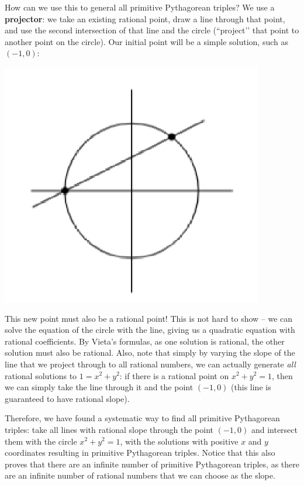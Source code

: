 \documentclass{article}
\begin{document}
How can we use this to general all primitive Pythagorean triples? We use a \textbf{projector}: we take an existing rational point, draw a line through that point, and use the second intersection of that line and the circle (``project’’ that point to another point on the circle). Our initial point will be a simple solution, such as $(-1, 0)$:

\begin{center}
\includegraphics[scale=1]{images/curve1.png}
\end{center}

This new point must also be a rational point! This is not hard to show – we can solve the equation of the circle with the line, giving us a quadratic equation with rational coefficients. By Vieta’s formulas, as one solution is rational, the other solution must also be rational. Also, note that simply by varying the slope of the line that we project through to all rational numbers, we can actually generate \textit{all} rational solutions to $1=x^2+y^2$: if there is a rational point on $x^2+y^2=1$, then we can simply take the line through it and the point $(-1, 0)$ (this line is guaranteed to have rational slope).

Therefore, we have found a systematic way to find all primitive Pythagorean triples: take all lines with rational slope through the point $(-1, 0)$ and intersect them with the circle $x^2+y^2=1$, with the solutions with positive $x$ and $y$ coordinates resulting in primitive Pythagorean triples. Notice that this also proves that there are an infinite number of primitive Pythagorean triples, as there are an infinite number of rational numbers that we can choose as the slope.
\end{document}
